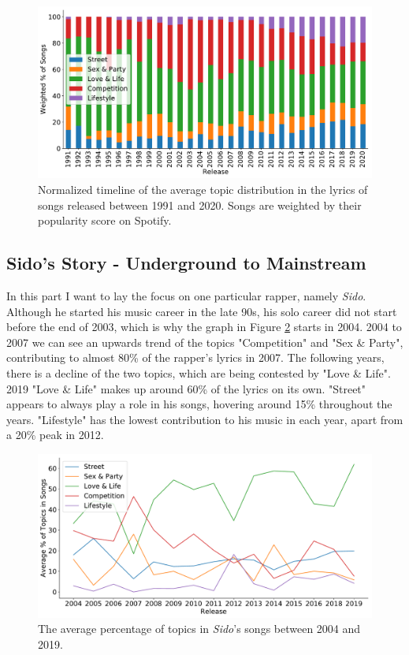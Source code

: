 \documentclass[conference]{IEEEtran}
\begin{document}
\begin{figure}[!t]
\includegraphics[width=\linewidth]{figures/w_timeline.pdf}
\vspace*{-8mm}
\caption{Normalized timeline of the average topic distribution in the lyrics of songs released between 1991 and 2020. Songs are weighted by their popularity score on Spotify.}
\label{fig:w_timeline}
\end{figure}

\subsection{Sido's Story - Underground to Mainstream}
In this part I want to lay the focus on one particular rapper, namely \textit{Sido}. Although he started his music career in the late 90s, his solo career did not start before the end of 2003, which is why the graph in Figure \ref{fig:sido} starts in 2004. 2004 to 2007 we can see an upwards trend of the topics "Competition" and "Sex \& Party", contributing to almost 80\% of the rapper's lyrics in 2007. The following years, there is a decline of the two topics, which are being contested by "Love \& Life". 2019 "Love \& Life" makes up around 60\% of the lyrics on its own. "Street" appears to always play a role in his songs, hovering around 15\% throughout the years. "Lifestyle" has the lowest contribution to his music in each year, apart from a 20\% peak in 2012.

\begin{figure}[!t]
\includegraphics[width=\linewidth]{figures/sido.pdf}
\vspace*{-8mm}
\caption{The average percentage of topics in \textit{Sido}'s songs between 2004 and 2019.}
\label{fig:sido}
\end{figure}
\end{document}
